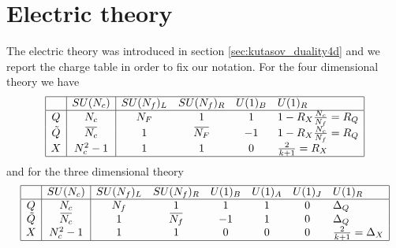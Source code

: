 \section{Electric theory}
The electric theory was introduced in section \ref{sec:kutasov_duality4d} and we report the charge table in order to fix our notation.
For the four dimensional theory we have
\begin{equation}
\begin{array}{| c | c | c c c l | }
\hline
 & SU(N_c) &SU(N_f)_L  &SU(N_f)_R   & U(1)_B &  U(1)_R \\
\hline
Q & N_c&N_F & 1   &  1  & 1 - 
R_X %
 \frac{N_c}{N_f} = R_Q \\
\tilde{Q} & \overbar{N_c} &  1 & \overbar{ N_F}   & -1   &   1 -
 R_X %
  \frac{N_c}{N_f}  = R_Q   \\
X & N_c^2-1 & 1   & 1    & 0   &  \frac{2}{k+1} = R_X \\
\hline
\end{array}
\centering
\end{equation}
%
%
and for the three dimensional theory
%
\begin{equation}
\begin{array}{ | c | c | c c c c c l |}
\hline
  & SU(N_c) & SU(N_f)_L & SU(N_f)_R& U(1)_B & U(1)_A & U(1)_J  & U(1)_R   \\
 \hline
 Q & N_c &N_f & 1& 1 & 1 & 0   & \Delta_Q  \\  
 \tilde{Q} & \overbar{N_c} & 1 & \overbar{N_f}& -1 & 1 & 0 & \Delta_Q      \\  
  X & N_c^2 -1& 1 & 1  & 0 &0 & 0 & \frac{2}{k+1} = \Delta_X  \\ 
 \hline
\end{array}
\end{equation}






